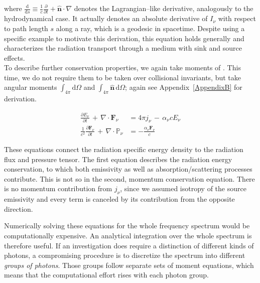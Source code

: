 where $\frac{\mathrm{d}}{\mathrm{d}s} \equiv \frac{1}{c}\frac{\partial}{\partial t} + \hat{\textbf{n}}\cdot\nabla$ denotes the Lagrangian--like derivative, analogously to the hydrodynamical case.
It actually denotes an absolute derivative of $I_{\nu}$ with respect to path length $s$ along a ray, which is a geodesic in spacetime.
Despite using a specific example to motivate this derivation, this equation holds generally and characterizes the radiation transport through a medium with sink and source effects.
\\[6pt]
%
To describe further conservation properties, we again take moments of .
This time, we do not require them to be taken over collisional invariants, but take angular moments $\int_{4\pi}\mathrm{d}\Omega$ and $\int_{4\pi}\hat{\textbf{n}}\,\mathrm{d}\Omega$; again see Appendix~\ref{AppendixB} for derivation.

\begin{align}
  \frac{\partial E_{\nu}}{\partial t} \,+\, \nabla\cdot\textbf{F}_{\nu} &= 4\pi j_{\nu}\,-\, \alpha_{\nu}cE_{\nu} \label{eq:Radiative_energy_moment} \\
  \frac{1}{c^{2}}\frac{\partial\textbf{F}_{\nu}}{\partial t} \,+\, \nabla\cdot\mathbb{P}_{\nu} &= - \frac{\alpha_{\nu}\textbf{F}_{\nu}}{c} \label{eq:Radiative_flux_moment}
\end{align}

These equations connect the radiation specific energy density to the radiation flux and pressure tensor.
The first equation describes the radiation energy conservation, to which both emissivity as well as absorption/scattering processes contribute.
This is not so in the second, momentum conservation equation.
There is no momentum contribution from $j_{\nu}$, since we assumed isotropy of the source emissivity and every term is canceled by its contribution from the opposite direction.

Numerically solving these equations for the whole frequency spectrum would be computationally expensive.
An analytical integration over the whole spectrum is therefore useful.
If an investigation does require a distinction of different kinds of photons, a compromising procedure is to discretize the spectrum into different \textit{groups of photons}.
Those groups follow separate sets of moment equations, which means that the computational effort rises with each photon group.

